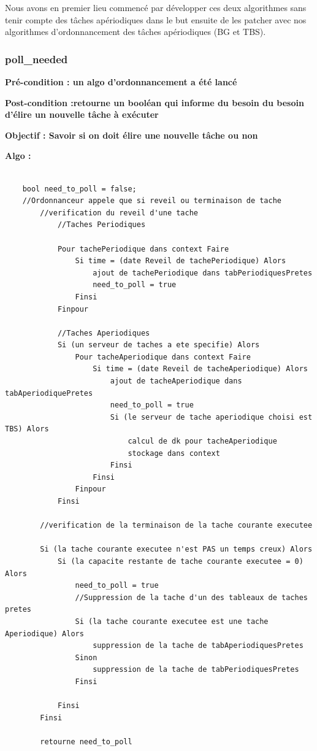 			Nous avons en premier lieu commencé par développer ces deux algorithmes sans tenir compte des tâches apériodiques dans le but ensuite de les \og patcher \fg avec nos algorithmes d'ordonnancement des tâches apériodiques (BG et TBS).
			
			
			\subsubsection{poll\_needed}
				\label{sec:algo_poll}

				\textbf{Pré-condition : un algo d'ordonnancement a été lancé} 
				
				\textbf{Post-condition :retourne un booléan qui informe du besoin du besoin d'élire un nouvelle tâche à exécuter} 
				
				\textbf{Objectif : Savoir si on doit élire une nouvelle tâche ou non} 
				
				\textbf{Algo :} 
					\begin{lstlisting}
					
	bool need_to_poll = false;
	//Ordonnanceur appele que si reveil ou terminaison de tache
		//verification du reveil d'une tache
			//Taches Periodiques
			
			Pour tachePeriodique dans context Faire
				Si time = (date Reveil de tachePeriodique) Alors
					ajout de tachePeriodique dans tabPeriodiquesPretes
					need_to_poll = true
				Finsi
			Finpour
			
			//Taches Aperiodiques
			Si (un serveur de taches a ete specifie) Alors
				Pour tacheAperiodique dans context Faire
					Si time = (date Reveil de tacheAperiodique) Alors
						ajout de tacheAperiodique dans tabAperiodiquePretes
						need_to_poll = true
						Si (le serveur de tache aperiodique choisi est TBS) Alors
							calcul de dk pour tacheAperiodique
							stockage dans context
						Finsi
					Finsi
				Finpour
			Finsi
			
		//verification de la terminaison de la tache courante executee
		
		Si (la tache courante executee n'est PAS un temps creux) Alors
			Si (la capacite restante de tache courante executee = 0) Alors
				need_to_poll = true
				//Suppression de la tache d'un des tableaux de taches pretes
				Si (la tache courante executee est une tache Aperiodique) Alors
					suppression de la tache de tabAperiodiquesPretes
				Sinon
					suppression de la tache de tabPeriodiquesPretes
				Finsi
		
			Finsi
		Finsi
		
		retourne need_to_poll
				
					\end{lstlisting}
				
